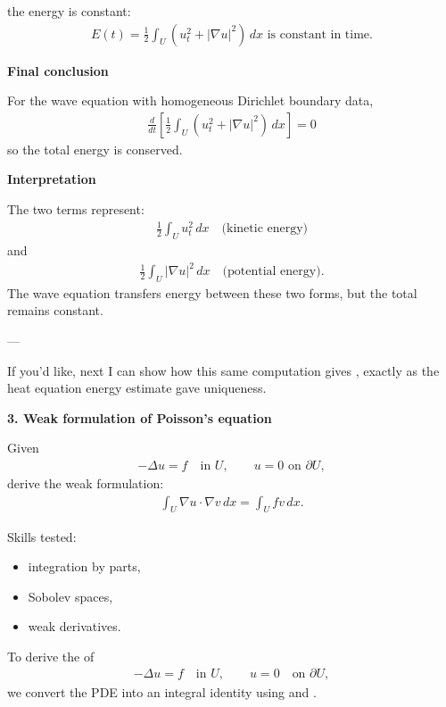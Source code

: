 \documentclass[12pt,a4paper]{report}
\begin{document}
\begin{description}
\begin{description}
the energy is constant:
\begin{align*}
\boxed{
E(t)=\frac12\int_U\left(u_t^2+|\nabla u|^2\right)\,dx
\text{ is constant in time.}
}
\end{align*}

\item \textbf{Final conclusion}

For the wave equation with homogeneous Dirichlet boundary data,
\begin{align*}
\boxed{
\frac{d}{dt} \left[ \frac12\int_U (u_t^2+|\nabla u|^2)\,dx \right] =0
}
\end{align*}
so the total energy is conserved.

\item \textbf{Interpretation}

The two terms represent:
\begin{align*}
\frac12\int_U u_t^2\,dx
\quad\text{(kinetic energy)}
\end{align*}
and
\begin{align*}
\frac12\int_U |\nabla u|^2\,dx
\quad\text{(potential energy)}.
\end{align*}
The wave equation transfers energy between these two forms, but the total remains constant.

\end{description}
---

If you'd like, next I can show how this same computation gives , exactly as the heat equation energy estimate gave uniqueness.


\newpage\item \textbf{3. Weak formulation of Poisson’s equation}

Given
\begin{align*}
-\Delta u=f \quad \text{in }U,\qquad u=0 \text{ on }\partial U,
\end{align*}
derive the weak formulation:
\begin{align*}
\int_U \nabla u\cdot\nabla v\,dx=\int_U fv\,dx.
\end{align*}

Skills tested:
	\begin{itemize}
    \item integration by parts,
    \item Sobolev spaces,
    \item weak derivatives.
	\end{itemize}

\HLINE


To derive the  of
\begin{align*}
-\Delta u=f
\quad\text{in }U,
\qquad
u=0
\quad\text{on }\partial U,
\end{align*}
we convert the PDE into an integral identity using  and .


\end{description}
\end{document}
